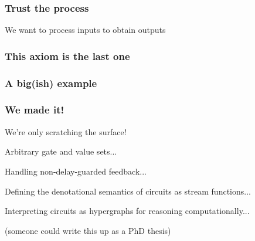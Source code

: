\begin{frame}
    \frametitle{Trust the process}

    \pause
    \LARGE
    \centering
    We want to \alert{process} inputs to obtain \alert{outputs}
    \normalsize

    \pause
    \vspace{1em}


\end{frame}
\begin{frame}
    \frametitle{This axiom is the last one}

    \pause
    \centering

    \vspace{1em}
    \pause


\end{frame}
\begin{frame}
    \frametitle{A big(ish) example}

    \centering

\end{frame}
\begin{frame}
    \frametitle{We made it!}

    \centering

    \LARGE
    We're only scratching the surface!

    \vspace{1em}

    \large
    \pause

    \alert{Arbitrary} gate and value sets...

    \pause

    Handling \alert{non-delay-guarded feedback}...

    \pause

    Defining the \alert{denotational semantics} of circuits as stream functions...

    \pause
    Interpreting circuits as \alert{hypergraphs} for reasoning computationally...

    \pause
    \vspace{1em}

    \scriptsize
    (someone could write this up as a PhD thesis)

\end{frame}